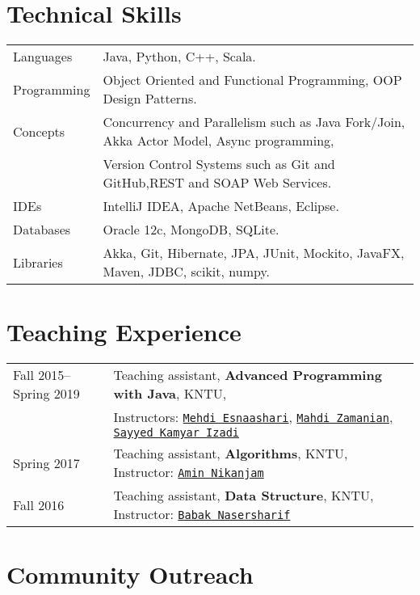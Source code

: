 \documentclass[letterpaper]{article}
\begin{document}
{{\section*{Technical Skills}

{\renewcommand{\arraystretch}{1.2}
\begin{tabular}{l l}
Languages & Java, Python, C++, Scala.
\\
Programming & Object Oriented and Functional Programming, OOP Design Patterns.
\\
Concepts & Concurrency and Parallelism such as Java Fork/Join, Akka Actor Model, Async programming, \\ & Version Control Systems such as Git and GitHub,REST and SOAP Web Services.
\\
IDEs & IntelliJ IDEA, Apache NetBeans, Eclipse.
\\
Databases & Oracle 12c, MongoDB, SQLite.
\\
Libraries & Akka, Git, Hibernate, JPA, JUnit, Mockito, JavaFX, Maven, JDBC, scikit, numpy.
\end{tabular}


\section*{Teaching Experience}

{\renewcommand{\arraystretch}{1.2}
\begin{tabular}{l l}
Fall 2015--Spring 2019 & Teaching assistant, \textbf{Advanced Programming with Java}, KNTU, \\&Instructors: \href{https://scholar.google.com/citations?hl=en&user=kf0UQKMAAAAJ}{\tt Mehdi Esnaashari}, \href{http://wp.kntu.ac.ir/zamanian/}{\tt Mahdi Zamanian}, \href{http://wwwlgis.informatik.uni-kl.de/cms/dbis/staff/formermembers/izadi/}{\tt Sayyed Kamyar Izadi} 
\\
Spring 2017 & Teaching assistant, \textbf{Algorithms}, KNTU, Instructor: \href{https://scholar.google.com/citations?user=mGF6p48AAAAJ&hl=en}{\tt Amin Nikanjam} 
\\
Fall 2016 & Teaching assistant, \textbf{Data Structure}, KNTU, Instructor: \href{http://wp.kntu.ac.ir/bnasersharif/}{\tt Babak Nasersharif} 

\end{tabular}


\section*{Community Outreach}

}}}}
\end{document}
